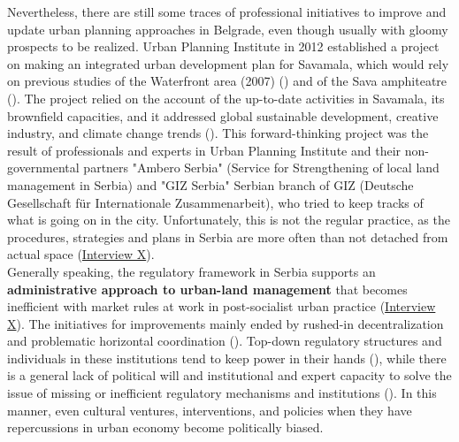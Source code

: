 \documentclass[11pt]{report}
\begin{document}
Nevertheless, there are still some traces of professional initiatives to improve and update urban planning approaches in Belgrade, even though usually with gloomy prospects to be realized.
Urban Planning Institute in 2012 established a project on making an integrated urban development plan for Savamala, which would rely on previous studies of the Waterfront area (2007)
(\cite{Nemanja Petrovic project})
and of the Sava amphiteatre
(\cite{ref studies}).
The project relied on the account of the up-to-date activities in Savamala, its brownfield capacities, and it addressed global sustainable development, creative industry, and climate change trends
(\cite{UZ Integrated Development plan}).
This forward-thinking project was the result of professionals and experts in Urban Planning Institute and their non-governmental partners "Ambero Serbia" (Service for Strengthening of local land management in Serbia) and "GIZ Serbia" {Serbian branch of  GIZ (Deutsche Gesellschaft für Internationale Zusammenarbeit)}, who tried to keep tracks of what is going on in the city.
Unfortunately, this is not the regular practice, as the procedures, strategies and plans in Serbia are more often than not detached from actual space
(\href{InterviewX}{Interview X}).
\\

Generally speaking, the regulatory framework in Serbia supports an \textbf{administrative approach to urban-land management} that becomes inefficient with market rules at work in post-socialist urban practice
(\href{InterviewX}{Interview X}).
The initiatives for improvements mainly ended by rushed-in decentralization and problematic horizontal coordination
(\cite{WOrldBank2015}).
Top-down regulatory structures and individuals in these institutions tend to keep power in their hands (\href{ref}{\citealt{vujovic_belgrades_2007}}), while there is a general lack of political will and institutional and expert capacity to solve the issue of missing or inefficient regulatory mechanisms and institutions (\href{ref}{\citealt{zekovic_planning_2015}}).
In this manner, even cultural ventures, interventions, and policies when they have repercussions in urban economy become politically biased.
\\
\end{document}
